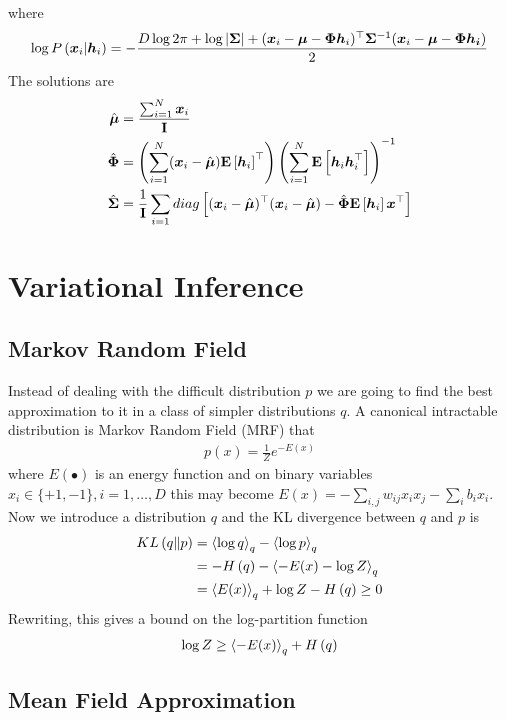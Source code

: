 where
\begin{align*}
	\log P\left(\boldsymbol{x}_i|\boldsymbol{h}_i\right)=-\frac{D\log 2\pi+\log\left\vert \mathbf{\Sigma} \right\vert+(\boldsymbol{x}_i-\boldsymbol{\mu}-\mathbf{\Phi}\boldsymbol{h}_i)^\top\mathbf{\Sigma}^{-1}(\boldsymbol{x}_i-\boldsymbol{\mu}-\mathbf{\Phi}\boldsymbol{h_i})}{2}
\end{align*}
The solutions are
\begin{align*}
	\hat{\boldsymbol{\mu}}&=\frac{\sum_{i=1}^N\boldsymbol{x}_i}{\mathbf{I}} \\
	\hat{\mathbf{\Phi}}&=\left(\sum_{i=1}^N(\boldsymbol{x}_i-\hat{\boldsymbol{\mu}})\mathbf{E}\left[\boldsymbol{h}_i\right]^\top\right)\left(\sum_{i=1}^N\mathbf{E}\left[\boldsymbol{h}_i\boldsymbol{h}_i^\top\right]\right)^{-1} \\
	\hat{\mathbf{\Sigma}}&=\frac{1}{\mathbf{I}}\sum_{i=1}diag\left[(\boldsymbol{x}_i-\hat{\boldsymbol{\mu}})^\top(\boldsymbol{x}_i-\hat{\boldsymbol{\mu}})-\hat{\mathbf{\Phi}}\mathbf{E}\left[\boldsymbol{h}_i\right]\boldsymbol{x}^\top\right]
\end{align*}



\section{Variational Inference}

\subsection{Markov Random Field}

Instead of dealing with the difficult distribution $p$ we are going to find the best approximation to it in a class of simpler distributions $q$. A canonical intractable distribution is Markov Random Field (MRF) that
\begin{align*}
	p(x)=\frac{1}{Z}e^{-E(x)}
\end{align*}
where $E(\bullet)$ is an energy function and on binary variables $x_i\in\{+1,-1\},i=1,\dots,D$ this may become $E(x)=-\sum_{i,j}w_{ij}x_ix_j-\sum_ib_ix_i$. Now we introduce a distribution $q$ and the KL divergence between $q$ and $p$ is
\begin{align*}
	KL\left(q\|p\right)&=\left\langle\log q\right\rangle_q-\left\langle\log p\right\rangle_q \\
	&=-H\left(q\right)-\left\langle-E(x)-\log Z\right\rangle_q \\
	&=\left\langle E(x)\right\rangle_q+\log Z-H\left(q\right)\geq 0
\end{align*}
Rewriting, this gives a bound on the log-partition function
\begin{align*}
	\log Z\geq\left\langle-E(x)\right\rangle_q+H\left(q\right)
\end{align*}

\subsection{Mean Field Approximation}

